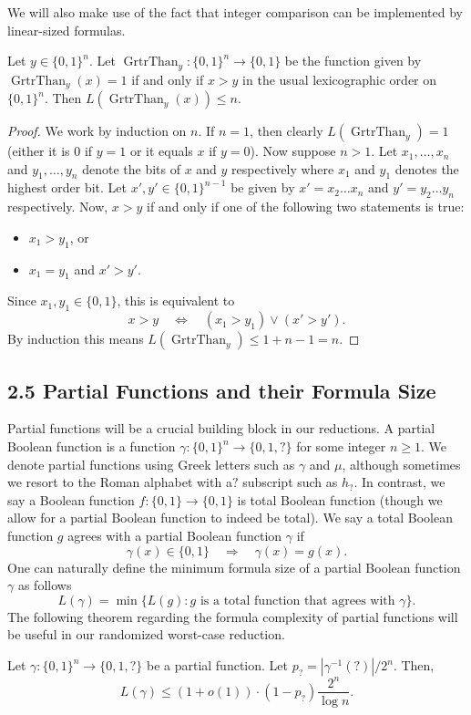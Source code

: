 We will also make use of the fact that integer comparison can be implemented by linear-sized formulas.
\begin{ntproposition}
Let $y\in\{0,1\}^n$. Let $\operatorname{GrtrThan}_y:\{0,1\}^n\to\{0,1\}$ be the function given by $\operatorname{GrtrThan}_y(x)=1$ if and only if $x>y$ in the usual lexicographic order on $\{0,1\}^n$. Then $L(\operatorname{GrtrThan}_y(x))\leq n$.
\end{ntproposition}
\begin{proof}
We work by induction on $n$. If $n=1$, then clearly $L(\operatorname{GrtrThan}_y)=1$ (either it is 0 if $y=1$ or it equals $x$ if $y=0$).
Now suppose $n>1$. Let $x_1,\ldots,x_n$ and $y_1,\ldots,y_n$ denote the bits of $x$ and $y$ respectively where $x_1$ and $y_1$ denotes the highest order bit. Let $x',y'\in\{0,1\}^{n-1}$ be given by $x'=x_2\ldots x_n$ and $y'=y_2\ldots y_n$ respectively.
Now, $x>y$ if and only if one of the following two statements is true:
\begin{itemize}\item $x_1>y_1$, or\item $x_1=y_1$ and $x'>y'$.\end{itemize}
Since $x_1,y_1\in\{0,1\}$, this is equivalent to
\[x>y\quad\Longleftrightarrow\quad(x_1>y_1)\lor(x'>y').\]
By induction this means $L(\operatorname{GrtrThan}_y)\leq 1+n-1=n$.
\end{proof}
\subsection*{2.5 Partial Functions and their Formula Size}
Partial functions will be a crucial building block in our reductions. A partial Boolean function is a function $\gamma:\{0,1\}^n\to\{0,1,?\}$ for some integer $n\geq 1$. We denote partial functions using Greek letters such as $\gamma$ and $\mu$, although sometimes we resort to the Roman alphabet with a$?$ subscript such as $h_?$.
In contrast, we say a Boolean function $f:\{0,1\}\to\{0,1\}$ is total Boolean function (though we allow for a partial Boolean function to indeed be total).
We say a total Boolean function $g$ agrees with a partial Boolean function $\gamma$ if
\[\gamma(x)\in\{0,1\}\quad\Longrightarrow\quad\gamma(x)=g(x).\]
One can naturally define the minimum formula size of a partial Boolean function $\gamma$ as follows
\[L(\gamma)=\min\{L(g):g\text{ is a total function that agrees with }\gamma\}.\]
The following theorem regarding the formula complexity of partial functions will be useful in our randomized worst-case reduction.
\begin{nttheorem}
Let $\gamma:\{0,1\}^n\to\{0,1,?\}$ be a partial function. Let $p_?=|\gamma^{-1}(?)|/2^n$. Then,
\[L(\gamma)\leq(1+o(1))\cdot(1-p_?)\frac{2^n}{\log n}.\]
\end{nttheorem}
